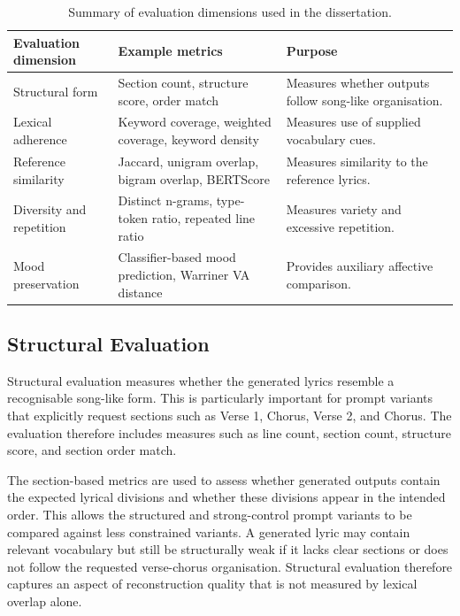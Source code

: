 \begin{table}[H]
\centering
\renewcommand{\arraystretch}{1.25}
\caption{Summary of evaluation dimensions used in the dissertation.}
\label{tab:evaluation_dimensions}
\begin{tabular}{
>{\raggedright\arraybackslash}p{}
>{\raggedright\arraybackslash}p{}
>{\raggedright\arraybackslash}p{}
}
\hline
Evaluation dimension & Example metrics & Purpose \\
\hline
Structural form & Section count, structure score, order match & Measures whether outputs follow song-like organisation. \\
Lexical adherence & Keyword coverage, weighted coverage, keyword density & Measures use of supplied vocabulary cues. \\
Reference similarity & Jaccard, unigram overlap, bigram overlap, BERTScore & Measures similarity to the reference lyrics. \\
Diversity and repetition & Distinct n-grams, type-token ratio, repeated line ratio & Measures variety and excessive repetition. \\
Mood preservation & Classifier-based mood prediction, Warriner VA distance & Provides auxiliary affective comparison. \\
\hline
\end{tabular}
\renewcommand{\arraystretch}{1.0}
\end{table}

\subsection{Structural Evaluation}

Structural evaluation measures whether the generated lyrics resemble a recognisable song-like form. This is particularly important for prompt variants that explicitly request sections such as Verse 1, Chorus, Verse 2, and Chorus. The evaluation therefore includes measures such as line count, section count, structure score, and section order match.

The section-based metrics are used to assess whether generated outputs contain the expected lyrical divisions and whether these divisions appear in the intended order. This allows the structured and strong-control prompt variants to be compared against less constrained variants. A generated lyric may contain relevant vocabulary but still be structurally weak if it lacks clear sections or does not follow the requested verse-chorus organisation. Structural evaluation therefore captures an aspect of reconstruction quality that is not measured by lexical overlap alone.


